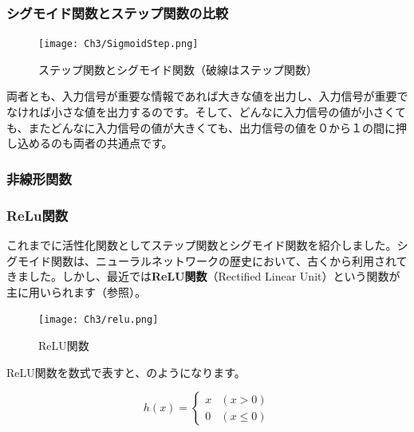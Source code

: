 \subsubsection{シグモイド関数とステップ関数の比較}
\begin{figure}[H]
  \vspace{0mm}
  \begin{center}
    \hspace{0mm}
    \centering
    \texttt{[image: Ch3/SigmoidStep.png]} \
    \vspace{0mm}
    \caption{ステップ関数とシグモイド関数（破線はステップ関数）}
    \label{fig:3_SigmoidStep}
  \end{center}
\end{figure}

両者とも、入力信号が重要な情報であれば大きな値を出力し、入力信号が重要でなければ小さな値を出力するのです。そして、どんなに入力信号の値が小さくても、またどんなに入力信号の値が大きくても、出力信号の値を０から１の間に押し込めるのも両者の共通点です。

\subsubsection{非線形関数}

\subsubsection{ReLu関数}
これまでに活性化関数としてステップ関数とシグモイド関数を紹介しました。シグモイド関数は、ニューラルネットワークの歴史において、古くから利用されてきました。しかし、最近では\textbf{ReLU関数}（Rectified Linear Unit）という関数が主に用いられます（参照）。

\begin{figure}[h]
  \vspace{0mm}
  \begin{center}
    \hspace{0mm}
    \centering
    \texttt{[image: Ch3/relu.png]} \
    \vspace{0mm}
    \caption{ReLU関数}
    \label{fig:3_relu}
  \end{center}
\end{figure}

ReLU関数を数式で表すと、のようになります。

\begin{equation}
    \label{eq:3_relu}
    h(x) = \left\{
\begin{array}{ll}
x & (x > 0)\\
0 & (x \le 0)
\end{array}
    \right.
\end{equation}

